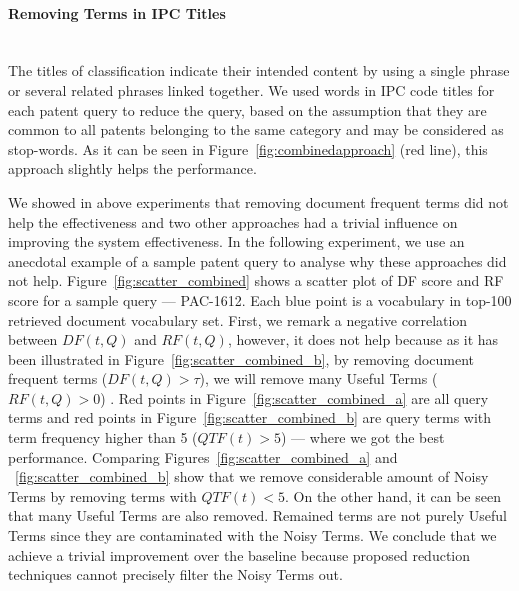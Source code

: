 \paragraph{Removing Terms in IPC Titles}
\ \\
The titles of classification indicate their intended content by using a single phrase or several related phrases linked together. We used words in IPC code titles for each patent query to reduce the query, based on the assumption that they are common to all patents belonging to the same category and may be considered as stop-words. As it can be seen in Figure~\ref{fig:combinedapproach} (red line), this approach slightly helps the performance.

We showed in above experiments that removing document frequent terms did not help the effectiveness and 
two other approaches had a trivial influence on improving the system effectiveness. 
In the following experiment, we use an anecdotal example of a sample patent query to analyse why these approaches did not help. 
Figure~\ref{fig:scatter_combined} shows a scatter plot of DF score and RF score for a sample query --- PAC-1612. Each blue point is a vocabulary in top-100 retrieved document vocabulary set. First, we remark a negative correlation between $\mathit{DF(t, Q)}$ and $\mathit{RF(t, Q)}$, however, it does not help because as it has been illustrated in Figure~\ref{fig:scatter_combined_b}, by removing document frequent terms ($DF(t, Q)>\tau$), we will remove many Useful Terms ($RF(t, Q)>0$) . Red points in Figure~\ref{fig:scatter_combined_a} are all query terms and red points in Figure~\ref{fig:scatter_combined_b} are query terms with term frequency higher than 5 ($QTF(t)>5$) --- where we got the best performance. 
Comparing Figures~\ref{fig:scatter_combined_a} and ~\ref{fig:scatter_combined_b} show that we remove considerable amount of Noisy Terms by removing terms with $QTF(t)<5$. 
On the other hand, it can be seen that many Useful Terms are also removed. Remained terms are not purely Useful Terms since they are contaminated with the Noisy Terms. We conclude that we achieve a trivial improvement over the baseline because proposed reduction techniques cannot precisely filter the Noisy Terms out. 
